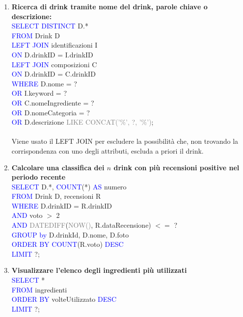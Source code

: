 \documentclass[a4paper,12pt]{report}
\begin{document}
\begin{enumerate}
            
    \item \textbf{Ricerca di drink tramite nome del drink, parole chiave o descrizione:}\\
    \textcolor{blue}{SELECT DISTINCT} D.*\\
    \textcolor{blue}{FROM} Drink D\\
    \textcolor{blue}{LEFT JOIN} identificazioni I \\
    \textcolor{blue}{ON} D.drinkID = I.drinkID\\
    \textcolor{blue}{LEFT JOIN} composizioni C \\
    \textcolor{blue}{ON} D.drinkID = C.drinkID\\
    \textcolor{blue}{WHERE} D.nome = ?\\
    \textcolor{blue}{OR} I.keyword = ?\\
    \textcolor{blue}{OR} C.nomeIngrediente = ?\\
    \textcolor{blue}{OR} D.nomeCategoria = ?\\
    \textcolor{blue}{OR} D.descrizione \textcolor{gray}{LIKE CONCAT('\%', ?, '\%')};
    \\\\
    Viene usato il LEFT JOIN per escludere la possibilità che, non trovando la corrispondenza con uno degli attributi, escluda a priori il drink.
            
        \item \textbf{Calcolare una classifica dei $n$ drink con più recensioni positive nel periodo recente}\\       
        \textcolor{blue}{SELECT} D.*, \textcolor{blue}{COUNT}(*) \textcolor{blue}{AS} numero\\
        \textcolor{blue}{FROM} Drink D, recensioni R\\
        \textcolor{blue}{WHERE} D.drinkID = R.drinkID\\
        \textcolor{blue}{AND} voto $>$ 2\\
        \textcolor{blue}{AND} \textcolor{gray}{DATEDIFF}(\textcolor{gray}{NOW()}, R.dataRecensione) $<=$ ?\\
        \textcolor{blue}{GROUP by} D.drinkId, D.nome, D.foto\\
        \textcolor{blue}{ORDER BY} \textcolor{blue}{COUNT}(R.voto) \textcolor{blue}{DESC}\\
        \textcolor{blue}{LIMIT} ?;
            
    \item \textbf{Visualizzare l’elenco degli ingredienti più utilizzati}\\ 
        \textcolor{blue}{SELECT} *\\
        \textcolor{blue}{FROM} ingredienti\\
        \textcolor{blue}{ORDER BY} volteUtilizzato \textcolor{blue}{DESC}\\
        \textcolor{blue}{LIMIT} ?;
    

\end{enumerate}
\end{document}
